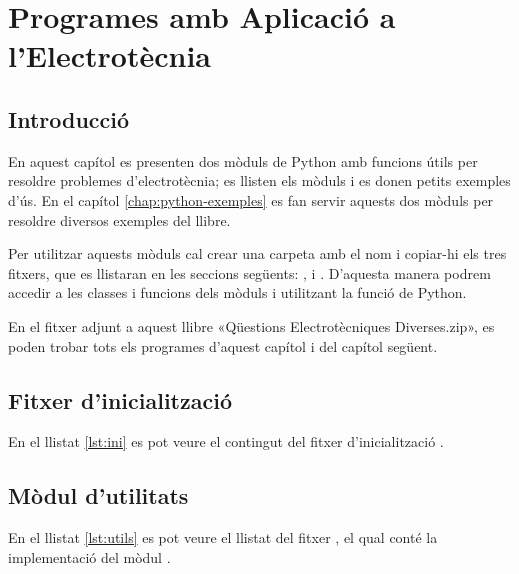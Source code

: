 \chapter{Programes amb Aplicació a l'Electrotècnia}\label{chap:python-programes}

\section{Introducció}

En aquest capítol es presenten dos mòduls de Python amb funcions útils per resoldre problemes d'electrotècnia; es llisten els  mòduls i es donen petits exemples d'ús. En el capítol \ref{chap:python-exemples} es fan servir aquests dos mòduls per resoldre diversos exemples del llibre.

Per utilitzar aquests mòduls cal crear una carpeta amb el nom  i copiar-hi els tres fitxers, que es llistaran en les seccions següents: ,  i . D'aquesta manera podrem accedir a les classes i funcions dels mòduls  i  utilitzant la funció  de Python.

En el fitxer adjunt a aquest llibre «Qüestions Electrotècniques Diverses.zip», es poden trobar tots els programes d'aquest capítol i del capítol següent.

\section{Fitxer d'inicialització}
En el llistat \vref{lst:ini} es pot veure el contingut del fitxer d'inicialització  .



\section{Mòdul d'utilitats}
En el llistat \vref{lst:utils} es pot veure el llistat del fitxer , el qual conté la implementació del mòdul .



